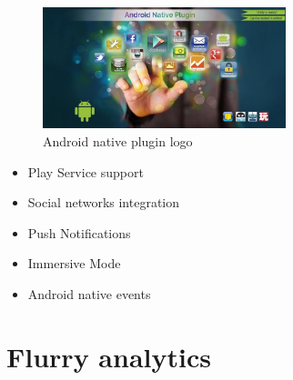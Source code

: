 \begin{figure}[h]
\centering
\includegraphics[width=200pt]{graphics/enabling-tech/androidnative_logo.jpeg}
\caption{Android native plugin logo}
\label{fig:androidnative_logo}
\end{figure}

\begin{itemize}
\item Play Service support
\item Social networks integration
\item Push Notifications
\item Immersive Mode
\item Android native events
\end{itemize}


\section{Flurry analytics}
\label{sec:flurry}
